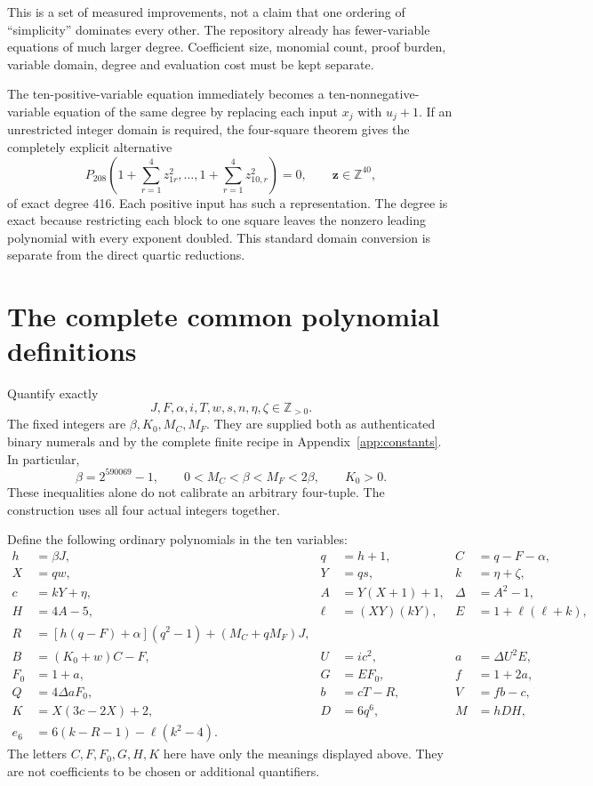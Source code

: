\documentclass[11pt]{article}
\theoremstyle{remark}\newtheorem{remark}[theorem]{Remark}
\newcommand{\Z}{\mathbb Z}\newcommand{\N}{\mathbb N}
\newcommand{\Pos}{\mathbb Z_{>0}}
\begin{document}
This is a set of measured improvements, not a claim that one ordering of
``simplicity'' dominates every other. The repository already has fewer-variable
equations of much larger degree. Coefficient size, monomial count, proof
burden, variable domain, degree and evaluation cost must be kept separate.

The ten-positive-variable equation immediately becomes a ten-nonnegative-variable
equation of the same degree by replacing each input $x_j$ with $u_j+1$.
If an unrestricted integer domain is required, the four-square theorem gives
the completely explicit alternative
\[
 P_{208}\left(1+\sum_{r=1}^4z_{1r}^2,\ldots,
                   1+\sum_{r=1}^4z_{10,r}^2\right)=0,
 \qquad \mathbf z\in\Z^{40},
\]
of exact degree 416. Each positive input has such a representation.
The degree is exact because restricting each block to one square leaves
the nonzero leading polynomial with every exponent doubled. This standard
domain conversion is separate from the direct quartic reductions.

\section{The complete common polynomial definitions}\label{sec:formula}

Quantify exactly
\[
 J,F,\alpha,i,T,w,s,n,\eta,\zeta\in\Pos.
\]
The fixed integers are $\beta,K_0,M_C,M_F$. They are supplied both as
authenticated binary numerals and by the complete finite recipe in
Appendix~\ref{app:constants}. In particular,
\[
 \beta=2^{590069}-1,\qquad
 0<M_C<\beta<M_F<2\beta,\qquad K_0>0.
\]
These inequalities alone do not calibrate an arbitrary four-tuple. The
construction uses all four actual integers together.

Define the following ordinary polynomials in the ten variables:
\begin{align*}
 h&=\beta J,&q&=h+1,&C&=q-F-\alpha,\\
 X&=qw,&Y&=qs,&k&=\eta+\zeta,\\
 c&=kY+\eta,&A&=Y(X+1)+1,&\Delta&=A^2-1,\\
 H&=4A-5,&\ell&=(XY)(kY),&E&=1+\ell(\ell+k),\\
 R&=[h(q-F)+\alpha](q^2-1)+(M_C+qM_F)J,\\
 B&=(K_0+w)C-F,&U&=ic^2,&a&=\Delta U^2E,\\
 F_0&=1+a,&G&=EF_0,&f&=1+2a,\\
 Q&=4\Delta aF_0,&b&=cT-R,&V&=fb-c,\\
 K&=X(3c-2X)+2,&D&=6q^6,&M&=hDH,\\
 e_6&=6(k-R-1)-\ell(k^2-4).
\end{align*}
The letters $C,F,F_0,G,H,K$ here have only the meanings displayed above.
They are not coefficients to be chosen or additional quantifiers.
\end{document}

